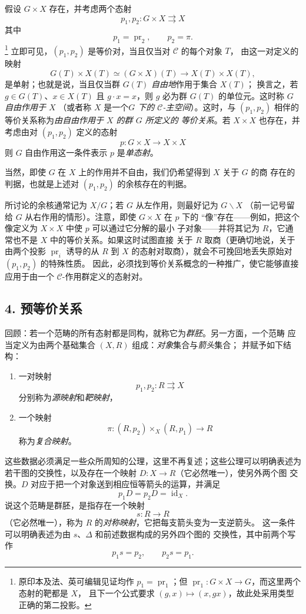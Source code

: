 假设 $G\times X$ 存在，并考虑两个态射
\[
  p_1,p_2:G\times X\rightrightarrows X
\]
其中
\[
  p_1=\operatorname{pr}_2,\qquad p_2=\pi.
\]
\footnote{原印本及法、英可编辑见证均作
$p_1=\operatorname{pr}_1$；但
$\operatorname{pr}_1:G\times X\to G$，而这里两个态射的靶都是 $X$，
且下一个公式要求 $(g,x)\mapsto(x,gx)$，故此处采用类型正确的第二投影。}
立即可见，$(p_1,p_2)$ 是等价对，当且仅当对 $\mathcal C$ 的每个对象 $T$，
由这一对定义的映射
\[
  G(T)\times X(T)\simeq(G\times X)(T)
  \longrightarrow X(T)\times X(T),
\]
是单射；也就是说，当且仅当群 $G(T)$ \emph{自由地}作用于集合 $X(T)$；
换言之，若 $g\in G(T)$、$x\in X(T)$ 且 $g\cdot x=x$，则 $g$ 必为群
$G(T)$ 的单位元。这时称 $G$ \emph{自由作用于 $X$}
（或者称 $X$ 是一个\emph{$G$ 下的 $\mathcal C$-主空间}）。这时，与
$(p_1,p_2)$ 相伴的等价关系称为\emph{由自由作用于 $X$ 的群 $G$ 所定义的
等价关系}。若 $X\times X$ 也存在，并考虑由对 $(p_1,p_2)$ 定义的态射
\[
  p:G\times X\longrightarrow X\times X
\]
则 $G$ 自由作用这一条件表示 $p$ 是\emph{单态射}。

当然，即使 $G$ 在 $X$ 上的作用并不自由，我们仍希望得到 $X$ 关于 $G$ 的商
存在的判据，也就是上述对 $(p_1,p_2)$ 的余核存在的判据。

所讨论的余核通常记为 $X/G$；若 $G$ 从左作用，则最好记为 $G\backslash X$
（前一记号留给 $G$ 从右作用的情形）。注意，即使 $G\times X$ 在 $p$ 下的
“像”存在——例如，把这个像定义为 $X\times X$ 中使 $p$ 可以通过它分解的最小
子对象——并将其记为 $R$，它通常也不是 $X$ 中的等价关系。如果这时试图直接
关于 $R$ 取商（更确切地说，关于由两个投影 $\operatorname{pr}_i$ 诱导的从
$R$ 到 $X$ 的态射对取商），就会不可挽回地丢失原始对 $(p_1,p_2)$ 的特殊性质。
因此，必须找到等价关系概念的一种推广，使它能够直接应用于由一个
$\mathcal C$-作用群定义的态射对。

\subsection*{4. 预等价关系}

回顾：若一个范畴的所有态射都是同构，就称它为\emph{群胚}。另一方面，一个范畴
应当定义为由两个基础集合 $(X,R)$ 组成：\emph{对象}集合与\emph{箭头}集合；
并赋予如下结构：
\begin{enumerate}
\item[(i)] 一对映射
\[
  p_1,p_2:R\rightrightarrows X
\]
分别称为\emph{源映射}和\emph{靶映射}，

\item[(ii)] 一个映射
\[
  \pi:(R,p_2)\times_X(R,p_1)\longrightarrow R
\]
称为\emph{复合映射}。
\end{enumerate}
这些数据必须满足一些众所周知的公理，这里不再复述；这些公理可以明确表述为
若干图的交换性，以及存在一个映射 $D:X\to R$（它必然唯一），使另外两个图
交换。$D$ 对应于把一个对象送到相应恒等箭头的运算，并满足
\[
  p_1D=p_2D=\operatorname{id}_X.
\]
说这个范畴是群胚，是指存在一个映射
\[
  s:R\longrightarrow R
\]
（它必然唯一），称为 $R$ 的\emph{对称映射}，它把每支箭头变为一支逆箭头。
这一条件可以明确表述为由 $s$、$\Delta$ 和前述数据构成的另外四个图的
交换性，其中前两个写作
\[
  p_1s=p_2,\qquad p_2s=p_1.
\]

